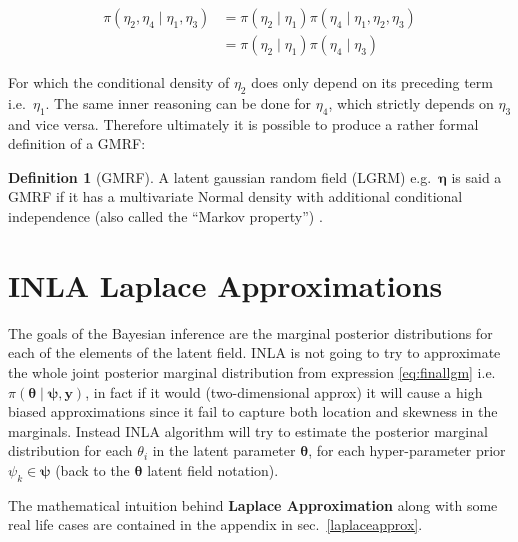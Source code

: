 \documentclass[
  12pt,
  a4paper,
  oneside]{book}
\theoremstyle{definition}
\newtheorem{definition}{Definition}[chapter]
\theoremstyle{definition}
\theoremstyle{definition}
\theoremstyle{remark}
\begin{document}
\begin{equation} 
\begin{split}
  \pi\left(\eta_{2}, \eta_{4} \mid \eta_{1}, \eta_{3}\right) &=\pi\left(\eta_{2} \mid \eta_{1}\right) \pi\left(\eta_{4} \mid \eta_{1}, \eta_{2}, \eta_{3}\right) \\
  & =\pi\left(\eta_{2} \mid \eta_{1}\right) \pi\left(\eta_{4} \mid \eta_{3}\right)
\end{split}
\label{eq:conditinal}
\end{equation}

For which the conditional density of \(\eta_2\) does only depend on its preceding term i.e.~\(\eta_1\). The same inner reasoning can be done for \(\eta_4\), which strictly depends on \(\eta_3\) and vice versa.
Therefore ultimately it is possible to produce a rather formal definition of a GMRF:

\begin{definition}[GMRF]
\protect\hypertarget{def:gmrf}{}{\label{def:gmrf} {} }A latent gaussian random field (LGRM) e.g.~\(\boldsymbol\eta\) is said a GMRF if it has a multivariate Normal density with additional conditional independence (also called the ``Markov property'') \citep{wang2018bayesian}.
\end{definition}

\hypertarget{approx}{%
\section{INLA Laplace Approximations}\label{approx}}

The goals of the Bayesian inference are the marginal posterior distributions for each of the elements of the latent field. INLA is not going to try to approximate the whole joint posterior marginal distribution from expression \eqref{eq:finallgm} i.e.~\(\pi(\boldsymbol{\theta} \mid \boldsymbol{\psi}, \boldsymbol{\mathbf{y}})\), in fact if it would (two-dimensional approx) it will cause a high biased approximations since it fail to capture both location and skewness in the marginals. Instead INLA algorithm will try to estimate the posterior marginal distribution for each \(\theta_{i}\) in the latent parameter \(\boldsymbol{\theta}\), for each hyper-parameter prior \(\psi_{k} \in \boldsymbol\psi\) (back to the \(\boldsymbol\theta\) latent field notation).

The mathematical intuition behind \textbf{Laplace Approximation} along with some real life cases are contained in the appendix in sec.~\ref{laplaceapprox}.
\end{document}
